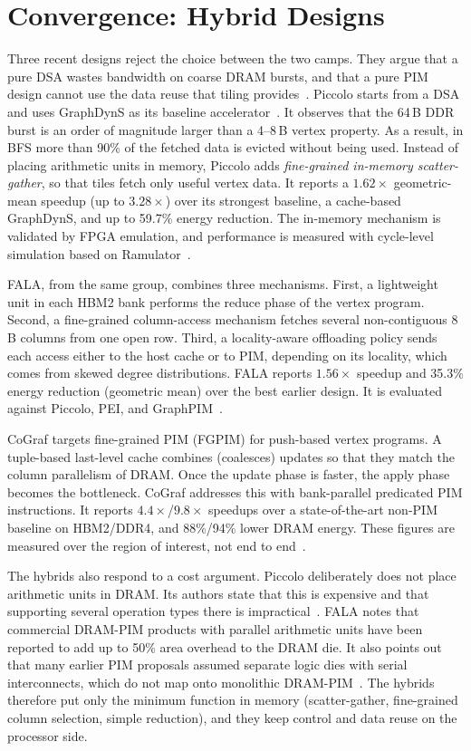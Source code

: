 \documentclass[journal,onecolumn]{IEEEtran}
\begin{document}
\section{Convergence: Hybrid Designs}\label{sec:hybrid}
Three recent designs reject the choice between the two camps. They argue that a pure DSA wastes bandwidth on coarse DRAM bursts, and that a pure PIM design cannot use the data reuse that tiling provides~\cite{shin2025piccolo,shin2025fala}. Piccolo starts from a DSA and uses GraphDynS as its baseline accelerator~\cite{shin2025piccolo}. It observes that the 64\,B DDR burst is an order of magnitude larger than a 4--8\,B vertex property. As a result, in BFS more than 90\% of the fetched data is evicted without being used. Instead of placing arithmetic units in memory, Piccolo adds \emph{fine-grained in-memory scatter-gather}, so that tiles fetch only useful vertex data. It reports a $1.62\times$ geometric-mean speedup (up to $3.28\times$) over its strongest baseline, a cache-based GraphDynS, and up to 59.7\% energy reduction. The in-memory mechanism is validated by FPGA emulation, and performance is measured with cycle-level simulation based on Ramulator~\cite{shin2025piccolo}.

FALA, from the same group, combines three mechanisms. First, a lightweight unit in each HBM2 bank performs the reduce phase of the vertex program. Second, a fine-grained column-access mechanism fetches several non-contiguous 8\,B columns from one open row. Third, a locality-aware offloading policy sends each access either to the host cache or to PIM, depending on its locality, which comes from skewed degree distributions. FALA reports $1.56\times$ speedup and 35.3\% energy reduction (geometric mean) over the best earlier design. It is evaluated against Piccolo, PEI, and GraphPIM~\cite{shin2025fala}.

CoGraf targets fine-grained PIM (FGPIM) for push-based vertex programs. A tuple-based last-level cache combines (coalesces) updates so that they match the column parallelism of DRAM. Once the update phase is faster, the apply phase becomes the bottleneck. CoGraf addresses this with bank-parallel predicated PIM instructions. It reports $4.4\times$/$9.8\times$ speedups over a state-of-the-art non-PIM baseline on HBM2/DDR4, and 88\%/94\% lower DRAM energy. These figures are measured over the region of interest, not end to end~\cite{yenimol2026cograf}.

The hybrids also respond to a cost argument. Piccolo deliberately does not place arithmetic units in DRAM. Its authors state that this is expensive and that supporting several operation types there is impractical~\cite{shin2025piccolo}. FALA notes that commercial DRAM-PIM products with parallel arithmetic units have been reported to add up to 50\% area overhead to the DRAM die. It also points out that many earlier PIM proposals assumed separate logic dies with serial interconnects, which do not map onto monolithic DRAM-PIM~\cite{shin2025fala}. The hybrids therefore put only the minimum function in memory (scatter-gather, fine-grained column selection, simple reduction), and they keep control and data reuse on the processor side.
\end{document}
